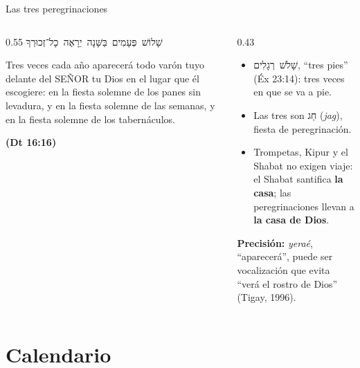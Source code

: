 \documentclass[hyperref={bookmarks=false},aspectratio=169]{beamer}
\newcommand{\heb}[1]{\mbox{\foreignlanguage{hebrew}{#1}}}
\newcommand{\SENOR}{S{\fontsize{0.78em}{1em}\selectfont EÑOR}}
\newcommand{\fuente}[1]{\par\hfill{\upshape\bfseries\footnotesize\textcolor{tierraroja}{#1}}}
\newcommand{\destacar}[1]{\textbf{\textcolor{tierraroja}{#1}}}
\newcommand{\precision}[1]{{\footnotesize\color{sepia}\textbf{Precisión:} #1}}
\begin{document}
\begin{frame}{Las tres peregrinaciones}
\begin{columns}[c,onlytextwidth]
\begin{column}{0.55\textwidth}
\centering\scriptsize\heb{שָׁלוֹשׁ פְּעָמִים בַּשָּׁנָה יֵרָאֶה כָל־זְכוּרְךָ}
\begin{cita}Tres veces cada año aparecerá todo varón tuyo delante del \SENOR{} tu Dios en el lugar que él escogiere: en la fiesta solemne de los panes sin levadura, y en la fiesta solemne de las semanas, y en la fiesta solemne de los tabernáculos.\fuente{(Dt 16:16)}\end{cita}
\end{column}
\begin{column}{0.43\textwidth}\small
\begin{itemize}
\item \heb{שָׁלֹשׁ רְגָלִים}, ``tres pies'' (Éx 23:14): tres veces en que se va a pie.
\item Las tres son \heb{חַג} (\emph{jag}), fiesta de peregrinación.
\item Trompetas, Kipur y el Shabat no exigen viaje: el Shabat santifica \destacar{la casa}; las peregrinaciones llevan a \destacar{la casa de Dios}.
\end{itemize}
\precision{\emph{yeraé}, ``aparecerá'', puede ser vocalización que evita ``verá el rostro de Dios'' (Tigay, 1996).}
\end{column}
\end{columns}
\end{frame}

\section{Calendario}
\end{document}
